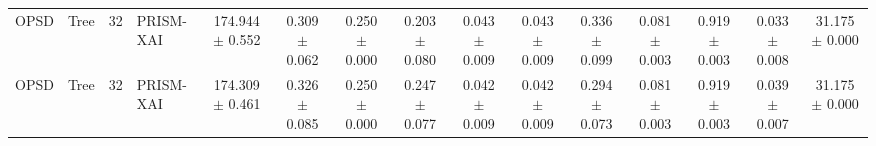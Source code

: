 \begin{table}[t]
\begin{tabular}{llllccccccccccc}
OPSD & Tree & 32 & PRISM-XAI & 174.944 $\pm$ 0.552 & 0.309 $\pm$ 0.062 & 0.250 $\pm$ 0.000 & 0.203 $\pm$ 0.080 & 0.043 $\pm$ 0.009 & 0.043 $\pm$ 0.009 & 0.336 $\pm$ 0.099 & 0.081 $\pm$ 0.003 & 0.919 $\pm$ 0.003 & 0.033 $\pm$ 0.008 & 31.175 $\pm$ 0.000 \\
OPSD & Tree & 32 & PRISM-XAI & 174.309 $\pm$ 0.461 & 0.326 $\pm$ 0.085 & 0.250 $\pm$ 0.000 & 0.247 $\pm$ 0.077 & 0.042 $\pm$ 0.009 & 0.042 $\pm$ 0.009 & 0.294 $\pm$ 0.073 & 0.081 $\pm$ 0.003 & 0.919 $\pm$ 0.003 & 0.039 $\pm$ 0.007 & 31.175 $\pm$ 0.000 \\
\bottomrule
\end{tabular}
\end{table}
